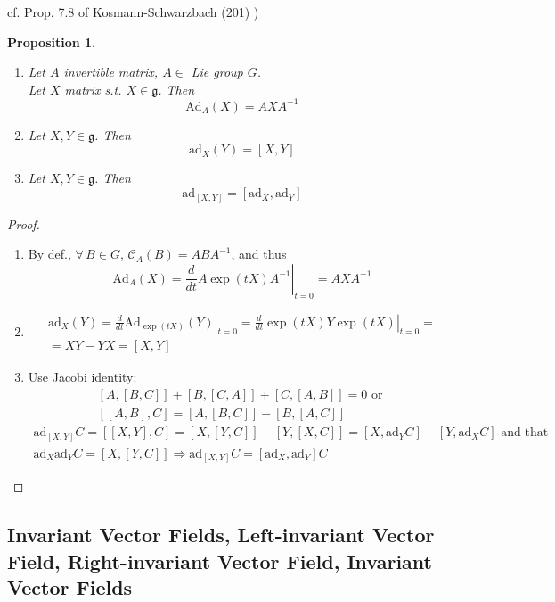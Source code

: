 \documentclass[10pt]{amsart}
\newtheorem{proposition}{Proposition}
\begin{document}
\begin{multicols*}{2}
cf. Prop. 7.8 of Kosmann-Schwarzbach (201) \cite{YKosmann-Schwarzbach2010})
\begin{proposition}
	\begin{enumerate}
		\item Let $A$ invertible matrix, $A \in $ Lie group $G$.  \\
		Let $X$ matrix s.t. $X \in \mathfrak{g}$.  Then
		\[
		\text{Ad}_A(X) = AXA^{-1}
		\]
		\item Let $X,Y \in \mathfrak{g}$.  Then 
		\[
		\text{ad}_X(Y) = [X,Y]
		\]
		\item Let $X,Y \in \mathfrak{g}$.  Then 
		\[
		\text{ad}_{[X,Y]} = [ \text{ad}_X, \text{ad}_Y ]
		\]
	\end{enumerate}
\end{proposition}
\begin{proof}
	\begin{enumerate}
		\item By def., $\forall \, B \in G$, $\mathcal{C}_A(B) = ABA^{-1}$, and thus
		\[
		\text{Ad}_A(X) = \left. \frac{d}{dt} A\exp{ (tX)  }A^{-1} \right|_{t=0} = AXA^{-1}
		\]
		\item \[
		\begin{gathered}
		\text{ad}_X(Y) = \left. \frac{d}{dt} \text{Ad}_{\exp{(tX)}}(Y) \right|_{t=0} = \left. \frac{d}{dt} \exp{(tX)} Y \exp{(tX)} \right|_{t=0} = \\
		= XY - YX = [X,Y] 
		\end{gathered}
		\]
		\item Use Jacobi identity: 
		\[
		\begin{gathered}
		[A,[B,C]] +  [B,[C,A]] +  [C,[A,B]] = 0 \text{ or } \\ 
		[[A,B],C] = [A,[B,C]] - [B,[A,C]]
		\end{gathered}
		\] 
		\[
		\begin{gathered}
		\text{ad}_{[X,Y]}C = [[X,Y],C] = [X,[Y,C]] - [Y,[X,C]] = [X,\text{ad}_YC] - [Y,\text{ad}_XC] \text{ and that } \\ 
		\text{ad}_X\text{ad}_Y C = [X,[Y,C]] \Longrightarrow \text{ad}_{[X,Y]}C = [\text{ad}_X,\text{ad}_Y ] C
		\end{gathered}
		\]
	\end{enumerate}
\end{proof}

\subsection{Invariant Vector Fields, Left-invariant Vector Field, Right-invariant Vector Field, Invariant Vector Fields}


\end{multicols*}
\end{document}
